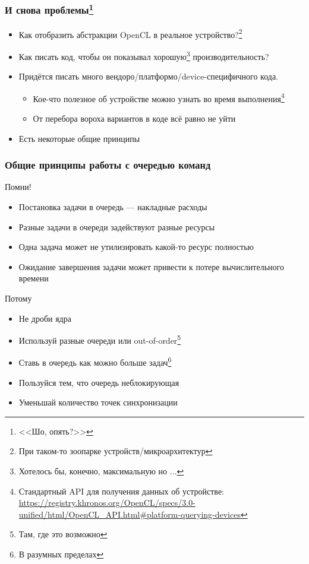\documentclass[xcolor=table,aspectratio=169]{beamer}
\begin{document}

\begin{frame}[fragile]
  \frametitle{И снова проблемы\footnote{<<Шо, опять?>>}}
  \begin{itemize}
    \item[\faQuestion] Как отобразить абстракции OpenCL в реальное устройство?\footnote{При таком-то зоопарке устройств/микроархитектур} 
    \item[\faQuestion] Как писать код, чтобы он показывал хорошую\footnote{Хотелось бы, конечно, максимальную но ...} производительность?    
  \end{itemize}
  \vfill
  \begin{itemize}
    \item[\faFrownO] Придётся писать много вендоро/платформо/device-специфичного кода.
    \begin{itemize} 
      \item[\faSmileO] Кое-что полезное об устройстве можно узнать во время выполнения\footnote{Стандартный API для получения данных об устройстве: \url{https://registry.khronos.org/OpenCL/specs/3.0-unified/html/OpenCL_API.html\#platform-querying-devices}}
      \item[\faMehO] От перебора вороха вариантов в коде всё равно не уйти 
    \end{itemize} 
    \item[\faExclamation] Есть некоторые общие принципы 
  \end{itemize}
\end{frame}

\begin{frame}[fragile]
  \frametitle{Общие принципы работы с очередью команд}
  Помни!
  \begin{itemize}
    \item Постановка задачи в очередь --- накладные расходы
    \item Разные задачи в очереди задействуют разные ресурсы
    \item Одна задача может не утилизировать какой-то ресурс полностью 
    \item Ожидание завершения задачи может привести к потере вычислительного времени
  \end{itemize}
  Потому
  \begin{itemize}
    \item Не дроби ядра
    \item Используй разные очереди или out-of-order\footnote{Там, где это возможно}
    \item Ставь в очередь как можно больше задач\footnote{В разумных пределах} 
    \item Пользуйся тем, что очередь неблокирующая
    \item Уменьшай количество точек синхронизации
  \end{itemize}
\end{frame}
\end{document}
